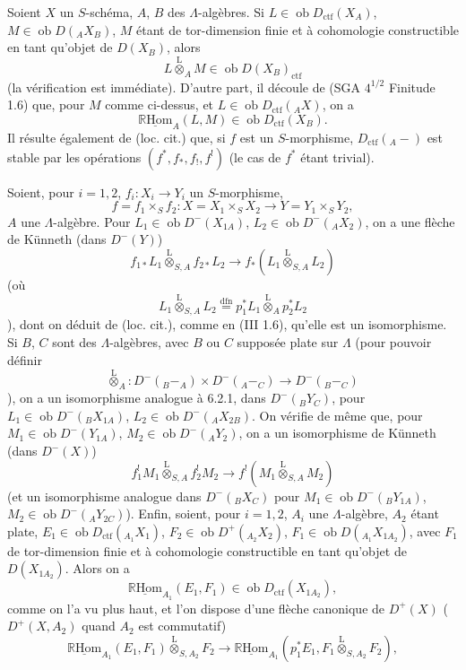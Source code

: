 \documentclass[11pt]{article}
\newcommand{\R}{\mathbb{R}}\newcommand{\RHomCore}{\mathbb{R}\mathrm{Hom}}
\providecommand{\RHom}{\RHomCore}
\providecommand{\uRHom}{\underline{\RHom}}
\providecommand{\lten}{\overset{\mathrm L}{\otimes}}
\providecommand{\Ob}{\operatorname{ob}}
\providecommand{\RHom}{\RHomCore}
\providecommand{\lten}{\overset{\mathrm L}{\otimes}}
\providecommand{\RHom}{\R\mathcal{H}om}
\providecommand{\lten}{\overset{\mathrm L}{\otimes}}
\providecommand{\Ob}{\operatorname{ob}}
\providecommand{\R}{\mathrm R}
\providecommand{\lten}{\overset{\mathrm L}{\otimes}}
\providecommand{\lten}{\overset{\mathrm L}{\otimes}}
\providecommand{\Ob}{\operatorname{Ob}}
\providecommand{\lten}{\overset{\mathrm L}{\otimes}}
\providecommand{\RHom}{\RHomCore}
\providecommand{\Ob}{\operatorname{ob}}
\providecommand{\Ob}{\operatorname{Ob}}
\providecommand{\lten}{\overset{\mathrm L}{\otimes}}
\begin{document}
Soient $X$ un $S$-schéma, $A$, $B$ des $\Lambda$-algèbres. Si $L\in\Ob D_{\mathrm{ctf}}(X_A)$, $M\in\Ob D({}_AX_B)$, $M$ étant de tor-dimension finie et à cohomologie constructible en tant qu'objet de $D(X_B)$, alors
\[
L\lten_A M\in\Ob D(X_B)_{\mathrm{ctf}}
\]
(la vérification est immédiate). D'autre part, il découle de (SGA $4^{1/2}$ Finitude 1.6) que, pour $M$ comme ci-dessus, et $L\in\Ob D_{\mathrm{ctf}}({}_AX)$, on a
\[
\uRHom_A(L,M)\in\Ob D_{\mathrm{ctf}}(X_B).
\]
Il résulte également de (loc. cit.) que, si $f$ est un $S$-morphisme, $D_{\mathrm{ctf}}({}_A-)$ est stable par les opérations $(f^*,f_*,f_!,f^!)$ (le cas de $f^*$ étant trivial).

Soient, pour $i=1,2$, $f_i:X_i\to Y_i$ un $S$-morphisme,
\[
f=f_1\times_S f_2:X=X_1\times_SX_2\longrightarrow Y=Y_1\times_SY_2,
\]
$A$ une $\Lambda$-algèbre.
Pour $L_1\in\Ob D^-(X_{1A})$, $L_2\in\Ob D^-({}_AX_2)$, on a une flèche de Künneth (dans $D^-(Y)$)
\begin{equation}
f_{1*}L_1\lten_{S,A}f_{2*}L_2
\longrightarrow
f_*(L_1\lten_{S,A}L_2)
\tag{6.2.1}
\end{equation}
(où
\[
L_1\lten_{S,A}L_2
\stackrel{\mathrm{dfn}}{=}p_1^*L_1\lten_Ap_2^*L_2
\]),
dont on déduit de (loc. cit.), comme en (III 1.6), qu'elle est un isomorphisme. Si $B$, $C$ sont des $\Lambda$-algèbres, avec $B$ ou $C$ supposée plate sur $\Lambda$ (pour pouvoir définir
\[
\lten_A:D^-({}_B{-}_A)\times D^-({}_A{-}_C)\longrightarrow D^-({}_B{-}_C)
\]),
on a un isomorphisme analogue à 6.2.1, dans $D^-({}_BY_C)$, pour $L_1\in\Ob D^-({}_BX_{1A})$, $L_2\in\Ob D^-({}_AX_{2B})$. On vérifie de même que, pour $M_1\in\Ob D^-(Y_{1A})$, $M_2\in\Ob D^-({}_AY_2)$, on a un isomorphisme de Künneth (dans $D^-(X)$)
\begin{equation}
f_1^!M_1\lten_{S,A}f_2^!M_2
\longrightarrow
f^!(M_1\lten_{S,A}M_2)
\tag{6.2.2}
\end{equation}
(et un isomorphisme analogue dans $D^-({}_B X_C)$ pour $M_1\in\Ob D^-({}_BY_{1A})$, $M_2\in\Ob D^-({}_AY_{2C})$). Enfin, soient, pour $i=1,2$, $A_i$ une $\Lambda$-algèbre, $A_2$ étant plate, $E_1\in\Ob D_{\mathrm{ctf}}({}_{A_1}X_1)$, $F_2\in\Ob D^+({}_{A_2}X_2)$, $F_1\in\Ob D({}_{A_1}X_{1A_2})$, avec $F_1$ de tor-dimension finie et à cohomologie constructible en tant qu'objet de $D(X_{1A_2})$. Alors on a
\[
\uRHom_{A_1}(E_1,F_1)\in\Ob D_{\mathrm{ctf}}(X_{1A_2}),
\]
comme on l'a vu plus haut, et l'on dispose d'une flèche canonique de $D^+(X)$ ($D^+(X,A_2)$ quand $A_2$ est commutatif)
\begin{equation}
\uRHom_{A_1}(E_1,F_1)\lten_{S,A_2}F_2
\longrightarrow
\uRHom_{A_1}(p_1^*E_1,F_1\lten_{S,A_2}F_2),
\tag{6.2.3}
\end{equation}
\end{document}
